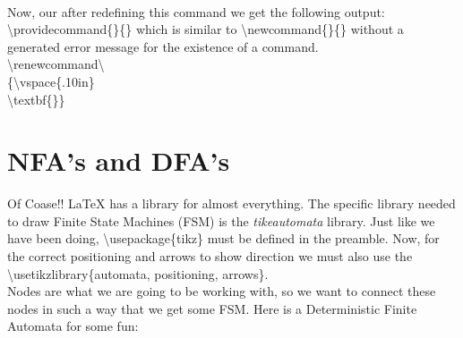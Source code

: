 \\

Now, our after redefining this command we get the following 
output:
\\

\textbackslash{providecommand}\{\}\{\} which is similar to 
\textbackslash{newcommand}\{\}\{\} without a generated 
error message for the existence of a command. \\ 


\textbackslash{renewcommand}\textbackslash{}\\
\{\textbackslash{vspace}\{.10in\} \\ 
\textbackslash{textbf}\{\}\} \\

\section{NFA's and DFA's}
Of Coase!! \LaTeX{} has a library for almost everything. The specific
library needed to draw Finite State Machines (FSM) is the 
\textit{tike\-automata} library. Just like we have been doing, 
\textbackslash{usepackage}\{tikz\} must be defined in the preamble.
Now, for the correct positioning and arrows to show direction we must
also use the \textbackslash{usetikzlibrary}\{automata, positioning, arrows\}.\\
Nodes are what we are going to be working with, so we want to connect
these nodes in such a way that we get some FSM. Here is a Deterministic
Finite Automata for some fun:
\cite{gtikz} \\

